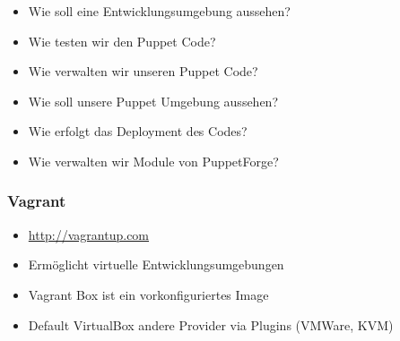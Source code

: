 \documentclass{beamer}
\begin{document}
\begin{frame}
  \begin{itemize}
  \item Wie soll eine Entwicklungsumgebung aussehen?
  \item Wie testen wir den Puppet Code?
  \item Wie verwalten wir unseren Puppet Code?
  \item Wie soll unsere Puppet Umgebung aussehen?
  \item Wie erfolgt das Deployment des Codes?
  \item Wie verwalten wir Module von PuppetForge?
  \end{itemize}
\end{frame}

\begin{frame}
\end{frame}

\begin{frame}
  \frametitle{Vagrant}

  \begin{itemize}
  \item \url{http://vagrantup.com}
  \item Ermöglicht virtuelle Entwicklungsumgebungen
  \item Vagrant Box ist ein vorkonfiguriertes Image
  \item Default VirtualBox andere Provider via Plugins (VMWare, KVM)
  \end{itemize}
\end{frame}

\begin{frame}
\end{frame}

\begin{frame}
\end{frame}
\end{document}

